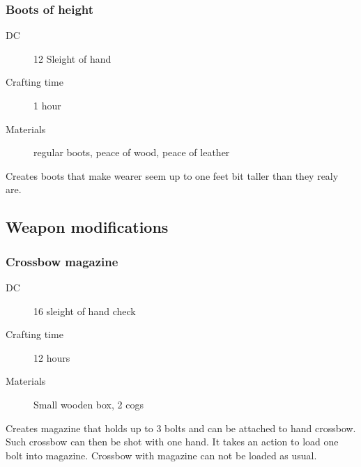 \subsubsection{Boots of height}

\begin{description}
\item [DC] 12 Sleight of hand
\item [Crafting time] 1 hour
\item [Materials] regular boots, peace of wood, peace of leather
\end{description}

Creates boots that make wearer seem up to one feet bit taller than they realy are.

\subsection{Weapon modifications}

\subsubsection{Crossbow magazine}

\begin{description}
\item [DC] 16 sleight of hand check
\item [Crafting time] 12 hours
\item [Materials] Small wooden box, 2 cogs
\end{description}

Creates magazine that holds up to 3 bolts and can be attached to hand crossbow. Such crossbow can then be shot with one hand. It takes an action to load one bolt into magazine. Crossbow with magazine can not be loaded as usual.
